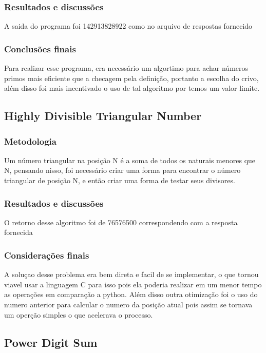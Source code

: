\documentclass{article}
\begin{document}
        \subsubsection{Resultados e discussões}
        A saida do programa foi 142913828922 como no arquivo de respostas fornecido
        
        \subsubsection{Conclusões finais} 
        Para realizar esse programa, era necessário um algortimo para achar números primos mais eficiente que a checagem pela definição, portanto a escolha do crivo, além disso foi mais incentivado o uso de tal algoritmo por temos um valor limite.
    \subsection{Highly Divisible Triangular Number}
        
        \subsubsection{Metodologia}
        Um número triangular na posição N é a soma de todos os naturais menores que N, pensando nisso, foi necessário criar uma forma para encontrar o número triangular de posição N, e então criar uma forma de testar seus divisores.
        
        \subsubsection{Resultados e discussões}
        O retorno desse algoritmo foi de 76576500 correspondendo com a resposta fornecida
        
        \subsubsection{Considerações finais}
        A soluçao desse problema era bem direta e facil de se implementar, o que tornou viavel usar a linguagem C para isso pois ela poderia realizar em um menor tempo as operações em comparação a python. Além disso outra otimização foi o uso do numero anterior para calcular o numero da posição atual pois assim se tornava um operção simples o que acelerava o processo.
        
    \subsection{Power Digit Sum}
       
\end{document}
